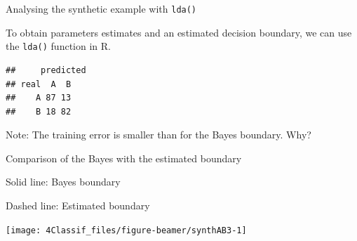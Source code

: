 \documentclass[10pt,ignorenonframetext,]{beamer}
\newenvironment{Shaded}{\begin{snugshade}}{\end{snugshade}}
\newcommand{\KeywordTok}[1]{\textcolor[rgb]{0.13,0.29,0.53}{\textbf{#1}}}
\newcommand{\DataTypeTok}[1]{\textcolor[rgb]{0.13,0.29,0.53}{#1}}
\newcommand{\StringTok}[1]{\textcolor[rgb]{0.31,0.60,0.02}{#1}}
\newcommand{\OperatorTok}[1]{\textcolor[rgb]{0.81,0.36,0.00}{\textbf{#1}}}
\newcommand{\NormalTok}[1]{#1}
\begin{document}
\begin{frame}[fragile]

\begin{block}{Analysing the synthetic example with \texttt{lda()}}

\vspace{2mm}

To obtain parameters estimates and an estimated decision boundary, we
can use the \texttt{lda()} function in R.

\scriptsize

\begin{Shaded}
\end{Shaded}

\begin{verbatim}
##     predicted
## real  A  B
##    A 87 13
##    B 18 82
\end{verbatim}

\normalsize
Note: The training error is smaller than for the Bayes boundary. Why?

\end{block}

\end{frame}

\begin{frame}

\begin{block}{Comparison of the Bayes with the estimated boundary}

\vspace{2mm}

Solid line: Bayes boundary

Dashed line: Estimated boundary \(~\)

\begin{center}\texttt{[image: 4Classif\_files/figure-beamer/synthAB3-1]} \end{center}

\end{block}

\end{frame}
\end{document}
